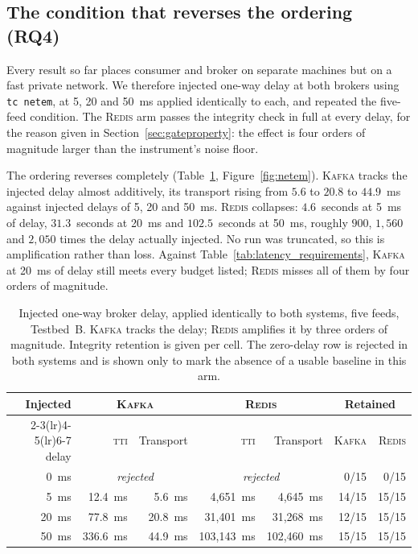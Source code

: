 \documentclass[Afour,sageh,times]{sagej}
\newcommand{\redis}{\textsc{Redis}}
\newcommand{\kafka}{\textsc{Kafka}}
\newcommand{\tti}{\textsc{tti}}
\begin{document}
\subsection{The condition that reverses the ordering (RQ4)}
\label{sec:netdelay}

Every result so far places consumer and broker on separate machines but on a fast private
network. We therefore injected one-way delay at both brokers using \texttt{tc netem}, at 5, 20 and
50~ms applied identically to each, and repeated the five-feed condition. The \redis{} arm passes
the integrity check in full at every delay, for the reason given in
Section~\ref{sec:gateproperty}: the effect is four orders of magnitude larger than the
instrument's noise floor.

The ordering reverses completely (Table~\ref{tab:netem}, Figure~\ref{fig:netem}). \kafka{} tracks
the injected delay almost additively, its transport rising from $5.6$ to $20.8$ to $44.9$~ms
against injected delays of 5, 20 and 50~ms. \redis{} collapses: $4.6$~seconds at 5~ms of delay,
$31.3$~seconds at 20~ms and $102.5$~seconds at 50~ms, roughly $900$, $1{,}560$ and $2{,}050$ times
the delay actually injected. No run was truncated, so this is amplification rather than loss.
Against Table~\ref{tab:latency_requirements}, \kafka{} at 20~ms of delay still meets every budget
listed; \redis{} misses all of them by four orders of magnitude.

\begin{table}[htbp]
\centering
\caption{Injected one-way broker delay, applied identically to both systems, five feeds,
Testbed~B. \kafka{} tracks the delay; \redis{} amplifies it by three orders of magnitude.
Integrity retention is given per cell. The zero-delay row is rejected in both systems and is
shown only to mark the absence of a usable baseline in this arm.}
\label{tab:netem}
\begin{tabular}{rrrrrrr}
\toprule
Injected & \multicolumn{2}{c}{\kafka{}} & \multicolumn{2}{c}{\redis{}}
& \multicolumn{2}{c}{Retained} \\
\cmidrule(lr){2-3}\cmidrule(lr){4-5}\cmidrule(lr){6-7}
delay & \tti{} & Transport & \tti{} & Transport & \kafka{} & \redis{} \\
\midrule
0~ms  & \multicolumn{2}{c}{\emph{rejected}} & \multicolumn{2}{c}{\emph{rejected}} & 0/15 & 0/15 \\
5~ms  & 12.4~ms  & 5.6~ms  & 4{,}651~ms   & 4{,}645~ms   & 14/15 & 15/15 \\
20~ms & 77.8~ms  & 20.8~ms & 31{,}401~ms  & 31{,}268~ms  & 12/15 & 15/15 \\
50~ms & 336.6~ms & 44.9~ms & 103{,}143~ms & 102{,}460~ms & 15/15 & 15/15 \\
\bottomrule
\end{tabular}
\end{table}
\end{document}
